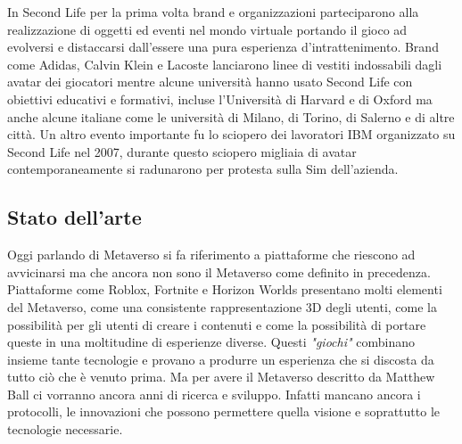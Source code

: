         In Second Life per la prima volta brand e organizzazioni parteciparono alla realizzazione di oggetti ed eventi nel mondo virtuale portando il gioco ad evolversi e distaccarsi dall'essere una pura esperienza d'intrattenimento. 
        Brand come Adidas, Calvin Klein e Lacoste lanciarono linee di vestiti indossabili dagli avatar dei giocatori \cite{Fascion2nd} mentre alcune università hanno usato Second Life con obiettivi educativi e formativi, incluse l'Università di Harvard e di Oxford \cite{University2ndLife} ma anche alcune italiane come le università di Milano, di Torino, di Salerno e di altre città. \cite{UnitoIn2ndLife} 
        Un altro evento importante fu lo sciopero dei lavoratori IBM organizzato su Second Life nel 2007, durante questo sciopero migliaia di avatar contemporaneamente si radunarono per protesta sulla Sim dell'azienda.
        
        

    \subsection{Stato dell'arte}

    Oggi parlando di Metaverso si fa riferimento a piattaforme che riescono ad avvicinarsi ma che ancora non sono il Metaverso come definito in precedenza.
    Piattaforme come Roblox, Fortnite e Horizon Worlds presentano molti elementi del Metaverso, come una consistente rappresentazione 3D degli utenti, come la possibilità per gli utenti di creare i contenuti e come la possibilità di portare queste in una moltitudine di esperienze diverse. 
    Questi \textit{"giochi"} combinano insieme tante tecnologie e provano a produrre un esperienza che si discosta da tutto ciò che è venuto prima. Ma per avere il Metaverso descritto da Matthew Ball ci vorranno ancora anni di ricerca e sviluppo. 
    Infatti mancano ancora i protocolli, le innovazioni che possono permettere quella visione e soprattutto le tecnologie necessarie.
    
